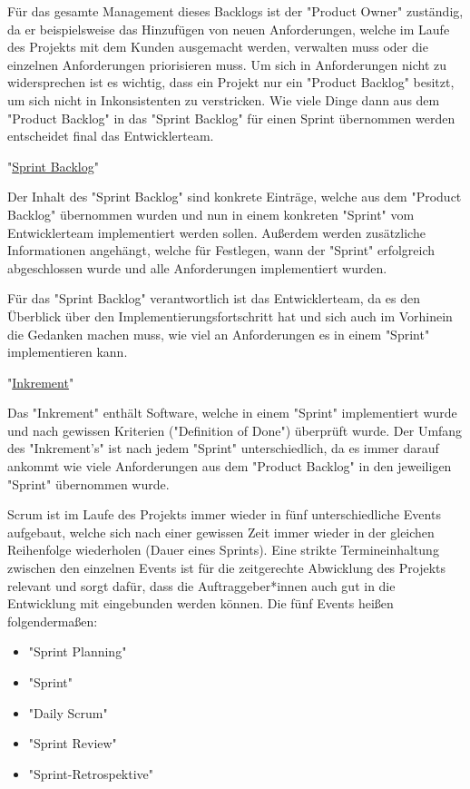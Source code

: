 Für das gesamte Management dieses Backlogs ist der "Product Owner" zuständig, da er beispielsweise das Hinzufügen von neuen Anforderungen, welche im Laufe des Projekts mit dem Kunden ausgemacht werden, verwalten muss oder die einzelnen Anforderungen priorisieren muss. Um sich in Anforderungen nicht zu widersprechen ist es wichtig, dass ein Projekt nur ein "Product Backlog" besitzt, um sich nicht in Inkonsistenten zu verstricken. Wie viele Dinge dann aus dem "Product Backlog" in das "Sprint Backlog" für einen Sprint übernommen werden entscheidet final das Entwicklerteam. \cite{ProductBacklog}

"\underline{Sprint Backlog}"

Der Inhalt des "Sprint Backlog" sind konkrete Einträge, welche aus dem "Product Backlog" übernommen wurden und nun in einem konkreten "Sprint" vom Entwicklerteam implementiert werden sollen. Außerdem werden zusätzliche Informationen angehängt, welche für Festlegen, wann der "Sprint" erfolgreich abgeschlossen wurde und alle Anforderungen implementiert wurden. \cite{SprintBacklog}

Für das "Sprint Backlog" verantwortlich ist das Entwicklerteam, da es den Überblick über den Implementierungsfortschritt hat und sich auch im Vorhinein die Gedanken machen muss, wie viel an Anforderungen es in einem "Sprint" implementieren kann. \cite{SprintBacklog}

"\underline{Inkrement}"

Das "Inkrement" enthält Software, welche in einem "Sprint" implementiert wurde und nach gewissen Kriterien ("Definition of Done") überprüft wurde. Der Umfang des "Inkrement's" ist nach jedem "Sprint" unterschiedlich, da es immer darauf ankommt wie viele Anforderungen aus dem "Product Backlog" in den jeweiligen "Sprint" übernommen wurde. \cite{Inkrement}


Scrum ist im Laufe des Projekts immer wieder in fünf unterschiedliche Events aufgebaut, welche sich nach einer gewissen Zeit immer wieder in der gleichen Reihenfolge wiederholen (Dauer eines Sprints). Eine strikte Termineinhaltung zwischen den einzelnen Events ist für die zeitgerechte Abwicklung des Projekts relevant und sorgt dafür, dass die Auftraggeber*innen auch gut in die Entwicklung mit eingebunden werden können. Die fünf Events heißen folgendermaßen:

\begin{itemize}
    \item "Sprint Planning"
    \item "Sprint"
    \item "Daily Scrum"
    \item "Sprint Review"
    \item "Sprint-Retrospektive"
\end{itemize}

